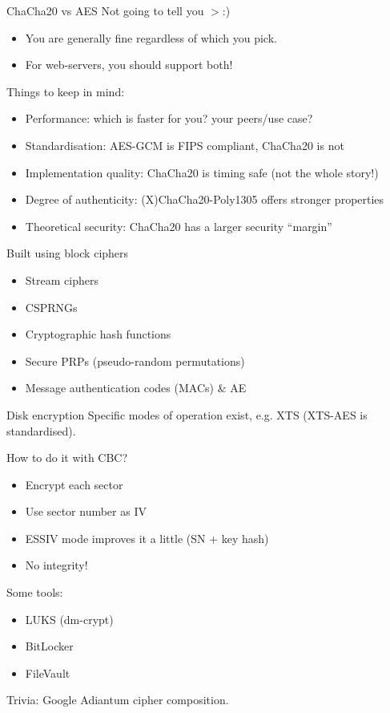 \begin{frame}{ChaCha20 vs AES}
  \pause
  Not going to tell you $>$:)
  \begin{itemize}[<+(1)->]
    \item You are generally fine regardless of which you pick.
    \item For web-servers, you should support both!
  \end{itemize}

  \pause
  Things to keep in mind:
  \begin{itemize}[<+(1)->]
    \item Performance: which is faster for you? your peers/use case?
    \item Standardisation: AES-GCM is FIPS compliant, ChaCha20 is not
    \item Implementation quality: ChaCha20 is timing safe (not the whole story!)
    \item Degree of authenticity: (X)ChaCha20-Poly1305 offers stronger properties
    \item Theoretical security: ChaCha20 has a larger security \enquote{margin}
  \end{itemize}
\end{frame}

\begin{frame}{Built using block ciphers}
  \begin{itemize}[<+(1)->]
    \item Stream ciphers
    \item CSPRNGs
    \item Cryptographic hash functions
    \item Secure PRPs (pseudo-random permutations)
    \item Message authentication codes (MACs) \& AE
  \end{itemize}
\end{frame}

\begin{frame}{Disk encryption}
  Specific modes of operation exist, e.g. XTS (XTS-AES is standardised).

  \pause
  How to do it with CBC?
  \begin{itemize}[<+(1)->]
    \item Encrypt each sector
    \item Use sector number as IV
    \item ESSIV mode improves it a little (SN + key hash)
    \item No integrity!
  \end{itemize}

  \pause
  Some tools:
  \begin{itemize}[<+(1)->]
    \item LUKS (dm-crypt)
    \item BitLocker
    \item FileVault
  \end{itemize}

  \pause
  Trivia: Google Adiantum cipher composition.
\end{frame}

